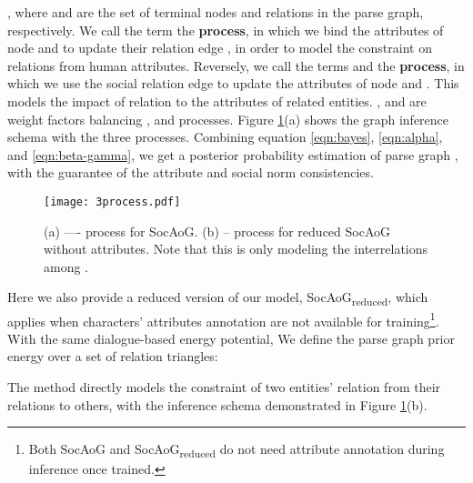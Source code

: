 \documentclass[11pt,a4paper]{article}
\begin{document}
, where  and  are the set of terminal nodes and relations in the parse graph, respectively.
We call the term  the \textbf{ process}, in which we bind the attributes of node  and  to update their relation edge , in order to model the constraint on relations from human attributes. 
Reversely, we call the terms  and  the \textbf{ process}, in which we use the social relation edge  to update the attributes of node  and . This models the impact of relation to the attributes of related entities. 
, and  are weight factors balancing ,  and  processes. Figure \ref{fig:3process}(a) shows the graph inference schema with the three processes. Combining equation \ref{eqn:bayes}, \ref{eqn:alpha}, and \ref{eqn:beta-gamma}, we get a posterior probability estimation  of parse graph , with the guarantee of the attribute and social norm consistencies. 
\begin{figure}[ht]
    \begin{center}
    \centerline{\texttt{[image: 3process.pdf]}}
    \caption{(a) ---- process for SocAoG. (b) -- process for reduced SocAoG without attributes. Note that this  is only modeling the interrelations among .}
    \label{fig:3process}
    \end{center}
    \vspace{-8mm}
\end{figure}

Here we also provide a reduced version of our model, SocAoG\textsubscript{reduced}, which applies when characters' attributes annotation are not available for training\footnote{Both SocAoG and SocAoG\textsubscript{reduced} do not need attribute annotation during inference once trained.}. With the same dialogue-based energy potential, We define the parse graph prior energy over a set of relation triangles:

The method directly models the constraint of two entities' relation from their relations to others, with the inference schema demonstrated in Figure \ref{fig:3process}(b). 
\end{document}
